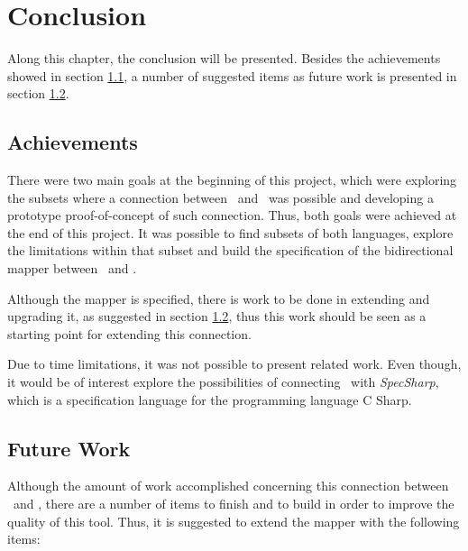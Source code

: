 \chapter{Conclusion}
\label{sec:chapterconclusion}

Along this chapter, the conclusion will be presented. Besides the achievements showed in section \ref{conc:achi}, a number of suggested items as future work is presented in section \ref{sec:chapterConclusion:futurework}.

\section{Achievements}
\label{conc:achi}

There were two main goals at the beginning of this project, which were exploring the subsets where a connection between \vpp\ and \jml\ was possible and developing a prototype proof-of-concept of such connection. Thus, both goals were achieved at the end of this project. It was possible to find subsets of both languages, explore the limitations within that subset and build the specification of the bidirectional mapper between \vpp\ and \jml. 

Although the mapper is specified, there is work to be done in extending and upgrading it, as suggested in section \ref{sec:chapterConclusion:futurework}, thus this work should be seen as a starting point for extending this connection.

Due to time limitations, it was not possible to present related work. Even though, it would be of interest explore the possibilities of connecting \vpp\ with \textit{SpecSharp}, which is a specification language for the programming language C Sharp.

\section{Future Work}
\label{sec:chapterConclusion:futurework}

Although the amount of work accomplished concerning this connection between \vpp\ and \jml, there are a number of items to finish and to build in order to improve the quality of this tool. Thus, it is suggested to extend the mapper with the following items:

